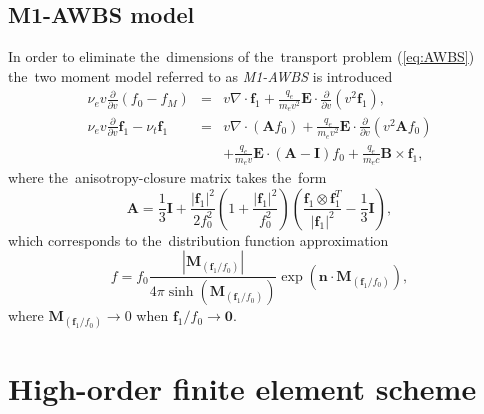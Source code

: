 \documentclass[preprint,12pt]{elsarticle}
\newcommand{\pdv}[2]{\frac{\partial{#1}}{\partial{#2}}}
\newcommand{\vect}[1]{\boldsymbol{#1}}
\newcommand{\matr}[1]{\mathbf{#1}}
\newcommand{\nue}{\nu_{e}}
\newcommand{\nutot}{\nu_{t}}
\newcommand{\vmag}{v}
\newcommand{\vn}{\vect{n}}
\newcommand{\E}{\vect{E}}
\newcommand{\B}{\vect{B}}
\newcommand{\qe}{q_e}
\newcommand{\me}{m_e}
\newcommand{\fM}{f_M}
\newcommand{\fzero}{f_0}
\newcommand{\fone}{\vect{f}_1}
\newcommand{\MI}{\matr{I}}
\newcommand{\MA}{\matr{A}}
\newcommand{\anisomega}{\fone/\fzero}
\newcommand{\acl}{\vect{M}_{\left(\anisomega\right)}}
\newcommand{\refeq}[1]{(\ref{#1})}
\newcounter{bla}
\begin{document}
\subsection{M1-AWBS model}
In order to eliminate the~dimensions of the~transport problem \refeq{eq:AWBS}
the~two moment model referred to as \textit{M1-AWBS} is introduced
\begin{eqnarray}
  \nue\vmag\pdv{}{\vmag}\left(\fzero - \fM \right) &=&
  \vmag\nabla\cdot\fone + \frac{\qe}{\me\vmag^2}\E\cdot\pdv{}{\vmag}
  \left( \vmag^2 \fone\right) , 
  \label{eq:M1f0}\\
  \nue\vmag\pdv{}{\vmag}\fone - \nutot\fone &=& 
  \vmag\nabla\cdot\left(\MA\fzero\right) + 
  \frac{\qe}{\me\vmag^2}\E\cdot\pdv{}{\vmag}
  \left( \vmag^2 \MA\fzero\right) \nonumber\\
  && + \frac{\qe}{\me\vmag}\E\cdot\left( \MA - \MI \right)\fzero +
  \frac{\qe}{\me c}\B\times\fone ,
  \label{eq:M1f1}
\end{eqnarray}
where the~anisotropy-closure matrix takes the~form
\begin{equation}
  \MA = \frac{1}{3}\MI + \frac{|\fone|^2}{2\fzero^2}
  \left( 1 + \frac{|\fone|^2}{\fzero^2} \right)
  \left( \frac{\fone\otimes\fone^T}{|\fone|^2} - \frac{1}{3}\MI\right) ,
\end{equation}
which corresponds to the~distribution function approximation
\begin{equation}
  f = \fzero \frac{\left|\acl\right|}{4\pi\sinh\left(\acl\right)}
  \exp\left(\vn\cdot\acl\right) ,
\end{equation}
where $\acl \rightarrow 0$ when $\anisomega \rightarrow \vect{0}$. 

\section{High-order finite element scheme}\label{sec:hos}

\end{document}
